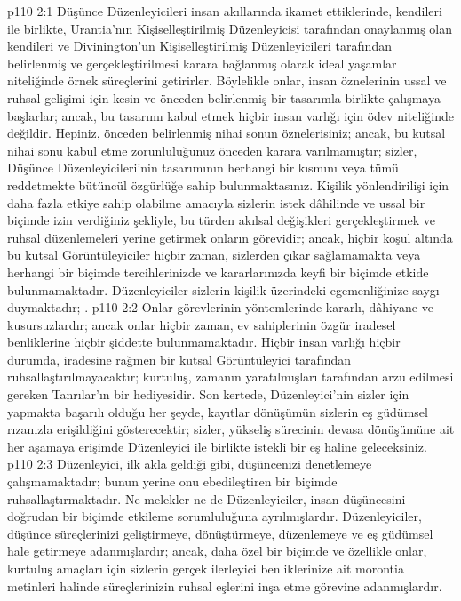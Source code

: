 \vs p110 2:1 Düşünce Düzenleyicileri insan akıllarında ikamet ettiklerinde, kendileri ile birlikte, Urantia’nın Kişiselleştirilmiş Düzenleyicisi tarafından onaylanmış olan kendileri ve Divinington’un Kişiselleştirilmiş Düzenleyicileri tarafından belirlenmiş ve gerçekleştirilmesi karara bağlanmış olarak ideal yaşamlar niteliğinde örnek süreçlerini getirirler. Böylelikle onlar, insan öznelerinin ussal ve ruhsal gelişimi için kesin ve önceden belirlenmiş bir tasarımla birlikte çalışmaya başlarlar; ancak, bu tasarımı kabul etmek hiçbir insan varlığı için ödev niteliğinde değildir. Hepiniz, önceden belirlenmiş nihai sonun öznelerisiniz; ancak, bu kutsal nihai sonu kabul etme zorunluluğunuz önceden karara varılmamıştır; sizler, Düşünce Düzenleyicileri’nin tasarımının herhangi bir kısmını veya tümü reddetmekte bütüncül özgürlüğe sahip bulunmaktasınız. Kişilik yönlendirilişi için daha fazla etkiye sahip olabilme amacıyla sizlerin istek dâhilinde ve ussal bir biçimde izin verdiğiniz şekliyle, bu türden akılsal değişikleri gerçekleştirmek ve ruhsal düzenlemeleri yerine getirmek onların görevidir; ancak, hiçbir koşul altında bu kutsal Görüntüleyiciler hiçbir zaman, sizlerden çıkar sağlamamakta veya herhangi bir biçimde tercihlerinizde ve kararlarınızda keyfi bir biçimde etkide bulunmamaktadır. Düzenleyiciler sizlerin kişilik üzerindeki egemenliğinize saygı duymaktadır; .
\vs p110 2:2 Onlar görevlerinin yöntemlerinde kararlı, dâhiyane ve kusursuzlardır; ancak onlar hiçbir zaman, ev sahiplerinin özgür iradesel benliklerine hiçbir şiddette bulunmamaktadır. Hiçbir insan varlığı hiçbir durumda, iradesine rağmen bir kutsal Görüntüleyici tarafından ruhsallaştırılmayacaktır; kurtuluş, zamanın yaratılmışları tarafından arzu edilmesi gereken Tanrılar’ın bir hediyesidir. Son kertede, Düzenleyici’nin sizler için yapmakta başarılı olduğu her şeyde, kayıtlar dönüşümün sizlerin eş güdümsel rızanızla erişildiğini gösterecektir; sizler, yükseliş sürecinin devasa dönüşümüne ait her aşamaya erişimde Düzenleyici ile birlikte istekli bir eş haline geleceksiniz.
\vs p110 2:3 Düzenleyici, ilk akla geldiği gibi, düşüncenizi denetlemeye çalışmamaktadır; bunun yerine onu ebedileştiren bir biçimde ruhsallaştırmaktadır. Ne melekler ne de Düzenleyiciler, insan düşüncesini doğrudan bir biçimde etkileme sorumluluğuna ayrılmışlardır. Düzenleyiciler, düşünce süreçlerinizi geliştirmeye, dönüştürmeye, düzenlemeye ve eş güdümsel hale getirmeye adanmışlardır; ancak, daha özel bir biçimde ve özellikle onlar, kurtuluş amaçları için sizlerin gerçek ilerleyici benliklerinize ait morontia metinleri halinde süreçlerinizin ruhsal eşlerini inşa etme görevine adanmışlardır.

